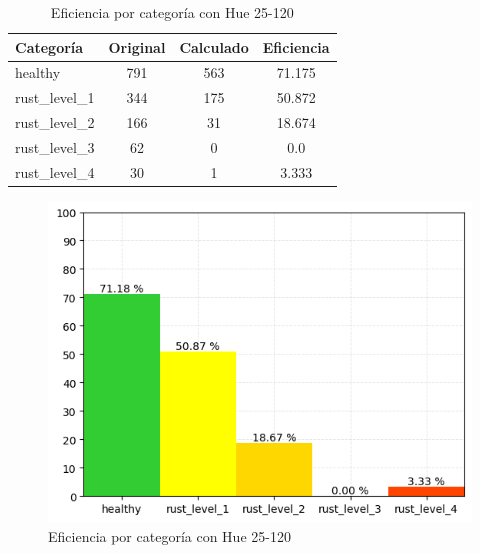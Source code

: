 \captionsetup[figure]{skip=10pt}

\begin{table}[H]
\centering
\begin{tabular}{|l|c|c|c|}
\hline 
\textbf{Categoría} & \textbf{Original} & \textbf{Calculado} & \textbf{Eficiencia} \\
\hline
healthy & 791 & 563 & 71.175 \\
\hline 
rust\_level\_1 & 344 & 175 & 50.872 \\
\hline 
rust\_level\_2 & 166 & 31 & 18.674 \\
\hline 
rust\_level\_3 & 62 & 0 & 0.0 \\
\hline 
rust\_level\_4 & 30 & 1 & 3.333 \\
\hline 
\end{tabular}
\caption{Eficiencia por categoría con Hue 25-120}
\label{table:efficiency_categories_25_120}
\end{table}

\begin{figure}[H]
\centering
\includegraphics[scale=0.6]{images/result_classes_25_120.png}
\caption{Eficiencia por categoría con Hue 25-120}
\label{img:efficiency_categories_25_120}
\end{figure}
